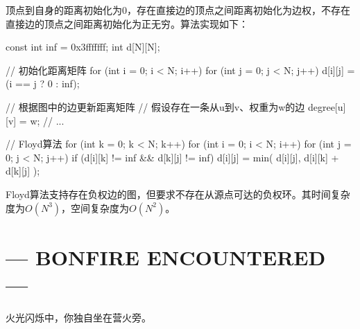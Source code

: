 顶点到自身的距离初始化为$0$，存在直接边的顶点之间距离初始化为边权，不存在直接边的顶点之间距离初始化为正无穷。算法实现如下：
\begin{cppcode}
    const int inf = 0x3fffffff;
    int d[N][N];

    // 初始化距离矩阵
    for (int i = 0; i < N; i++) {
        for (int j = 0; j < N; j++) {
            d[i][j] = (i == j ? 0 : inf);
        }
    }

    // 根据图中的边更新距离矩阵
    // 假设存在一条从u到v、权重为w的边
    degree[u][v] = w;
    // ...

    // Floyd算法
    for (int k = 0; k < N; k++) {
        for (int i = 0; i < N; i++) {
            for (int j = 0; j < N; j++) {
                if (d[i][k] != inf &&
                    d[k][j] != inf) {
                    d[i][j] = min(
                        d[i][j],
                        d[i][k] + d[k][j]
                    );
                }
            }
        }
    }
\end{cppcode}
Floyd算法支持存在负权边的图，但要求不存在从源点可达的负权环。其时间复杂度为$O(N^3)$，空间复杂度为$O(N^2)$。






\chapter*{--- BONFIRE ENCOUNTERED ---}%
火光闪烁中，你独自坐在营火旁。


